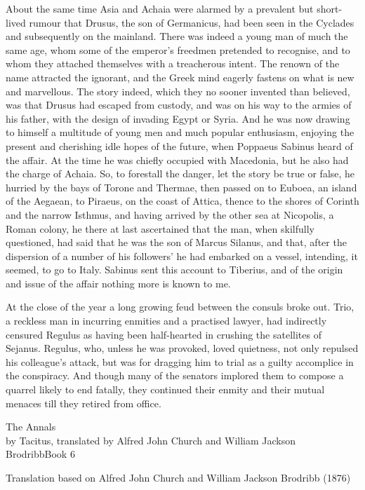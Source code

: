 About the same time Asia and Achaia were alarmed by a prevalent but short-lived rumour that Drusus, the son of Germanicus, had been seen in the Cyclades and subsequently on the mainland. There was indeed a young man of much the same age, whom some of the emperor's freedmen pretended to recognise, and to whom they attached themselves with a treacherous intent. The renown of the name attracted the ignorant, and the Greek mind eagerly fastens on what is new and marvellous. The story indeed, which they no sooner invented than believed, was that Drusus had escaped from custody, and was on his way to the armies of his father, with the design of invading Egypt or Syria. And he was now drawing to himself a multitude of young men and much popular enthusiasm, enjoying the present and cherishing idle hopes of the future, when Poppaeus Sabinus heard of the affair. At the time he was chiefly occupied with Macedonia, but he also had the charge of Achaia. So, to forestall the danger, let the story be true or false, he hurried by the bays of Torone and Thermae, then passed on to Euboea, an island of the Aegaean, to Piraeus, on the coast of Attica, thence to the shores of Corinth and the narrow Isthmus, and having arrived by the other sea at Nicopolis, a Roman colony, he there at last ascertained that the man, when skilfully questioned, had said that he was the son of Marcus Silanus, and that, after the dispersion of a number of his followers' he had embarked on a vessel, intending, it seemed, to go to Italy. Sabinus sent this account to Tiberius, and of the origin and issue of the affair nothing more is known to me.


At the close of the year a long growing feud between the consuls broke out. Trio, a reckless man in incurring enmities and a practised lawyer, had indirectly censured Regulus as having been half-hearted in crushing the satellites of Sejanus. Regulus, who, unless he was provoked, loved quietness, not only repulsed his colleague's attack, but was for dragging him to trial as a guilty accomplice in the conspiracy. And though many of the senators implored them to compose a quarrel likely to end fatally, they continued their enmity and their mutual menaces till they retired from office.


The Annals\\
by Tacitus, translated by Alfred John Church and William Jackson BrodribbBook 6

Translation based on Alfred John Church and William Jackson Brodribb (1876)

